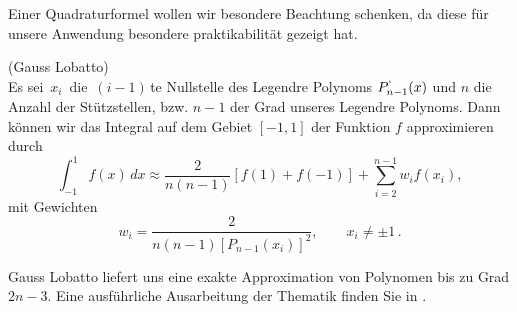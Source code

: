 Einer Quadraturformel wollen wir besondere Beachtung schenken, da diese für unsere Anwendung besondere praktikabilität gezeigt hat. 

\begin{Definition} (Gauss Lobatto) \\
Es sei $\, x_i \, $ die $\, (i-1) \,$te Nullstelle des Legendre Polynoms $P^{`}_{n-1}(x)$ und $n$ die Anzahl der Stützstellen, bzw. $n-1$ der Grad unseres Legendre Polynoms. Dann können wir das Integral auf dem Gebiet $[-1,1]$ der Funktion $f$ approximieren durch
\begin{equation*}
\int _{-1}^{1}{f(x)\,dx} \approx {\frac {2}{n(n-1)}}[f(1)+f(-1)]+\sum _{i=2}^{n-1}{w_{i}f(x_{i})},
\end{equation*}
mit Gewichten
\begin{equation*}
w_{i}={\frac {2}{n(n-1)[P_{n-1}(x_{i})]^{2}}},\qquad x_{i}\neq \pm 1 \, .
\end{equation*}
\end{Definition}

Gauss Lobatto liefert uns eine exakte Approximation von Polynomen bis zu Grad $2n-3$. Eine ausführliche  Ausarbeitung der Thematik finden Sie in \cite[79]{Rannacher}.





